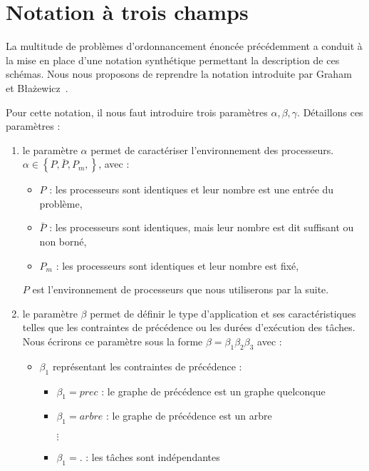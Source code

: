 \documentclass[a4paper,11pt]{report}
\begin{document}
\section{Notation à trois champs}

La multitude de problèmes d'ordonnancement énoncée précédemment a conduit à la mise en place d'une
notation synthétique permettant la description de ces schémas. Nous nous proposons de reprendre la
notation introduite par Graham~\cite{graham} et B\l a\.zewicz~\cite{blazewicz}. 

Pour cette notation, il nous faut introduire trois paramètres $\alpha, \beta, \gamma$. Détaillons
ces paramètres :
\begin{enumerate}
    \item le paramètre $\alpha$ permet de caractériser l'environnement des processeurs. $\alpha \in
        \left\{ P, \bar{P}, P_m, \right\}$, avec :
        \begin{itemize}
            \item \textbf{$P$} : les processeurs sont identiques et leur nombre est une entrée du
                problème, 
            \item $\bar{P}$ : les processeurs sont identiques, mais leur nombre est dit suffisant ou
                non borné,
            \item $P_m$ : les processeurs sont identiques et leur nombre est fixé,
        \end{itemize}
        $P$ est l'environnement de processeurs que nous utiliserons par la suite.
    \item le paramètre $\beta$ permet de définir le type d'application et ses caractéristiques
        telles que les contraintes de précédence ou les durées d'exécution des tâches. Nous écrirons
        ce paramètre sous la forme $\beta = \beta_1\beta_2\beta_3$ avec :
        \begin{itemize}[label=$\bullet$]
            \item $\beta_1$ représentant les contraintes de précédence :
                \begin{itemize}
                    \item $\beta_1 = prec$ : le graphe de précédence est un graphe quelconque
                    \item $\beta_1 = arbre$ : le graphe de précédence est un arbre
                    \item[$\vdots$]
                    \item $\beta_1 = .$ : les tâches sont indépendantes

\end{itemize}
\end{itemize}
\end{enumerate}
\end{document}
